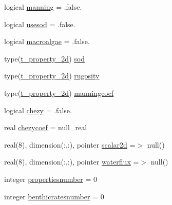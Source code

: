 \begin{DoxyCompactItemize}
\item 
logical \mbox{\hyperlink{structmoduleinterfacesedimentwater_1_1t__interfacesedimentwater_ab625329925dc3f8eb6be400aa569e2d5}{manning}} = .false.
\item 
logical \mbox{\hyperlink{structmoduleinterfacesedimentwater_1_1t__interfacesedimentwater_a867516b291f77c32f02cd04391d98005}{usesod}} = .false.
\item 
logical \mbox{\hyperlink{structmoduleinterfacesedimentwater_1_1t__interfacesedimentwater_af98e46e19787d29dbcfa03b99c3906f3}{macroalgae}} = .false.
\item 
type(\mbox{\hyperlink{structmoduleinterfacesedimentwater_1_1t__property__2d}{t\+\_\+property\+\_\+2d}}) \mbox{\hyperlink{structmoduleinterfacesedimentwater_1_1t__interfacesedimentwater_ad13e7d9dd0f6e6e73845336edd79a747}{sod}}
\item 
type(\mbox{\hyperlink{structmoduleinterfacesedimentwater_1_1t__property__2d}{t\+\_\+property\+\_\+2d}}) \mbox{\hyperlink{structmoduleinterfacesedimentwater_1_1t__interfacesedimentwater_ad59d4914730c2846f9d6533d2d2d0e8b}{rugosity}}
\item 
type(\mbox{\hyperlink{structmoduleinterfacesedimentwater_1_1t__property__2d}{t\+\_\+property\+\_\+2d}}) \mbox{\hyperlink{structmoduleinterfacesedimentwater_1_1t__interfacesedimentwater_a1c639acc300f5682bef2f155ae6d6f65}{manningcoef}}
\item 
logical \mbox{\hyperlink{structmoduleinterfacesedimentwater_1_1t__interfacesedimentwater_ac308e2a41ace8ad70e05628c4a2ce718}{chezy}} = .false.
\item 
real \mbox{\hyperlink{structmoduleinterfacesedimentwater_1_1t__interfacesedimentwater_a85c21be01fefff932bf6dfba12813172}{chezycoef}} = null\+\_\+real
\item 
real(8), dimension(\+:,\+:), pointer \mbox{\hyperlink{structmoduleinterfacesedimentwater_1_1t__interfacesedimentwater_ab8c6ea62da54a920b2d3a4fd48b28726}{scalar2d}} =$>$ null()
\item 
real(8), dimension(\+:,\+:), pointer \mbox{\hyperlink{structmoduleinterfacesedimentwater_1_1t__interfacesedimentwater_aa0cd367f8df8949e90ec7dd71e268ecf}{waterflux}} =$>$ null()
\item 
integer \mbox{\hyperlink{structmoduleinterfacesedimentwater_1_1t__interfacesedimentwater_a952de394f3583be3f54c62c27e46fd86}{propertiesnumber}} = 0
\item 
integer \mbox{\hyperlink{structmoduleinterfacesedimentwater_1_1t__interfacesedimentwater_a6883e8a12ed55df938f532c5a0aae7ae}{benthicratesnumber}} = 0

\end{DoxyCompactItemize}
